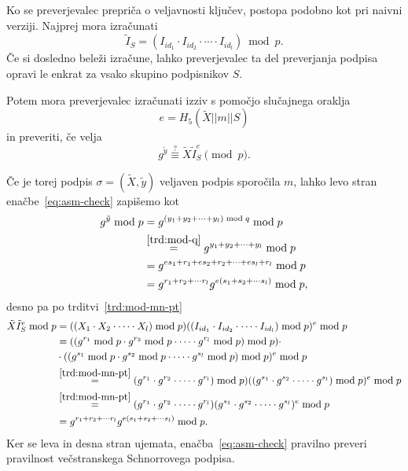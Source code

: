 \documentclass[isrm2, tisk]{fmfdelo}
\begin{document}
Ko se preverjevalec prepriča o veljavnosti ključev, postopa podobno kot pri naivni verziji. Najprej
mora izračunati
$$
\tilde{I}_S = (I_{id_1} \cdot I_{id_2} \cdot \cdots \cdot I_{id_l}) \bmod p.
$$
Če si dosledno beleži izračune, lahko preverjevalec ta del preverjanja podpisa opravi le enkrat za
vsako skupino podpisnikov $S$.

Potem mora preverjevalec izračunati izziv s pomočjo slučajnega oraklja
$$
e = H_5(\tilde{X} || m || S)
$$
in preveriti, če velja
\begin{equation}
\label{eq:asm-check}
g^{\tilde{y}} \stackrel{?}{\equiv} \tilde{X} \tilde{I}_S^e \pmod p.
\end{equation}

Če je torej podpis $\sigma = (\tilde{X}, \tilde{y})$ veljaven podpis sporočila $m$, lahko levo stran
enačbe~\eqref{eq:asm-check} zapišemo kot
\begin{align*}
    g^{\tilde{y}} \bmod p &= g^{(y_1 + y_2 + \cdots + y_l) \bmod q} \bmod p \\
                          &\stackrel{\ref{trd:mod-q}}{=} g^{y_1 + y_2 + \cdots + y_l} \bmod p \\
                          &= g^{e s_1 + r_1 + e s_2 + r_2 + \cdots + e s_l + r_l} \bmod p \\
                          &= g^{r_1 + r_2 + \cdots r_l} g^{e (s_1 + s_2 + \cdots s_l)} \bmod p,
\end{align*}
desno pa po trditvi~\ref{trd:mod-mn-pt}
\begin{align*}
    \tilde{X} \tilde{I}_S^e \bmod p &= ((X_1 \cdot X_2 \cdot \cdots \cdot X_l) \bmod p)
        ((I_{id_1} \cdot I_{id_2} \cdot \cdots \cdot I_{id_l}) \bmod p)^e \bmod p \\
    &=((g^{r_1} \bmod p \cdot g^{r_2} \bmod p \cdot \cdots \cdot g^{r_l} \bmod p) \bmod p) \cdot \\
    &\cdot ((g^{s_1} \bmod p \cdot g^{s_2} \bmod p \cdot \cdots \cdot g^{s_l} \bmod p) \bmod p)^e \bmod p \\
    &\stackrel{\ref{trd:mod-mn-pt}}{=} (g^{r_1} \cdot g^{r_2} \cdot \cdots \cdot g^{r_l}) \bmod p) 
        ((g^{s_1} \cdot g^{s_2} \cdot \cdots \cdot g^{s_l}) \bmod p)^e \bmod p \\
    &\stackrel{\ref{trd:mod-mn-pt}}{=} (g^{r_1} \cdot g^{r_2} \cdot \cdots \cdot g^{r_l}) 
        (g^{s_1} \cdot g^{s_2} \cdot \cdots \cdot g^{s_l})^e \bmod p \\
    &= g^{r_1 + r_2 + \cdots r_l} g^{e (s_1 + s_2 + \cdots s_l)} \bmod p.
\end{align*}
Ker se leva in desna stran ujemata, enačba~\eqref{eq:asm-check} pravilno preveri pravilnost večstranskega
Schnorrovega podpisa.
\end{document}
